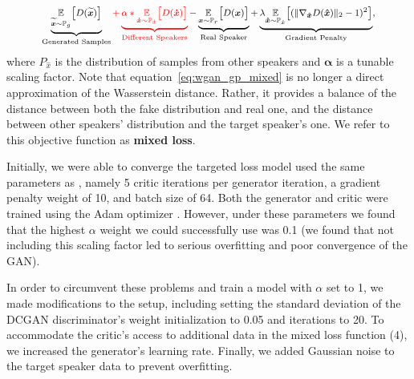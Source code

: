 \tiny
\begin{align}
\medmath{
    \underbrace{\underset{\boldsymbol{\widetilde{x}} \sim
    \mathbb{P}_{g}}{\mathbb{E}}
    \big[D(\boldsymbol{\widetilde{x}})\big]}_\text{Generated Samples}
    \color{red} +  \underbrace{\alpha * \underset{\boldsymbol{\dot{x}} \sim
    \mathbb{P}_{\dot{x}}}{\mathbb{E}}
    \big[D(\boldsymbol{\dot{x}})\big]}_\text{Different Speakers} \color{black} -
    \underbrace{\underset{\boldsymbol{x} \sim \mathbb{P}_{r}}{\mathbb{E}}
    \big[D(\boldsymbol{x})\big]}_\text{Real Speaker}  + \underbrace{\lambda
    \underset{\boldsymbol{\hat{x}} \sim \mathbb{P}_{\hat{x}}}{\mathbb{E}}
    \big[(\lVert \nabla_{\boldsymbol{\hat{x}}} D(\boldsymbol{\hat{x}}) \rVert_2
    - 1)^2\big]}_\text{Gradient Penalty}\label{eq:wgan_gp_mixed},
}
\end{align}
\normalsize
where $P_{\hat{x}}$ is the distribution of samples from other speakers and
$\mathbf{\alpha}$ is a tunable scaling factor. Note that
equation~\ref{eq:wgan_gp_mixed} is no longer a direct approximation of the
Wasserstein distance. Rather, it provides a balance of the distance between both
the fake distribution and real one, and the distance between other speakers'
distribution and the target speaker's one. We refer to this objective function
as \textbf{mixed loss}.

Initially, we were able to converge the targeted loss model used the same
parameters as \cite{gulrajani2017improved}, namely 5 critic iterations per
generator iteration, a gradient penalty weight of 10, and batch size of 64. Both
the generator and critic were trained using the Adam optimizer
\cite{kingma2014adam}. However, under these parameters we found that the highest
$\alpha$ weight we could successfully use was 0.1 (we found that not including
this scaling factor led to serious overfitting and poor convergence of the GAN).

In order to circumvent these problems and train a model with $\alpha$ set to 1,
we made modifications to the setup, including setting the standard deviation of
the DCGAN discriminator's weight initialization to 0.05 and iterations to 20. To
accommodate the critic's access to additional data in the mixed loss function
(4), we increased the generator's learning rate. Finally, we added Gaussian noise
to the target speaker data to prevent overfitting. 
